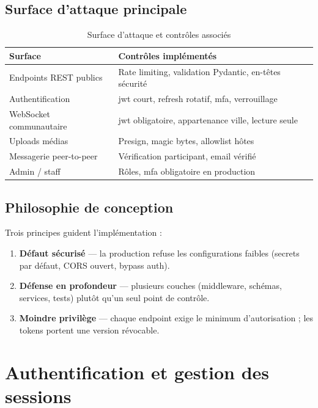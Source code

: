 \subsection{Surface d'attaque principale}

\begin{table}[H]
  \centering
  \caption{Surface d'attaque et contrôles associés}
  \label{tab:attack-surface}
  \begin{tabularx}{\textwidth}{@{}lX@{}}
    \toprule
    \textbf{Surface} & \textbf{Contrôles implémentés} \\
    \midrule
    Endpoints REST publics & Rate limiting, validation Pydantic, en-têtes sécurité \\
    Authentification & \gls{jwt} court, refresh rotatif, \gls{mfa}, verrouillage \\
    WebSocket communautaire & \gls{jwt} obligatoire, appartenance ville, lecture seule \\
    Uploads médias & Presign, magic bytes, allowlist hôtes \\
    Messagerie peer-to-peer & Vérification participant, email vérifié \\
    Admin / staff & Rôles, \gls{mfa} obligatoire en production \\
    \bottomrule
  \end{tabularx}
\end{table}

\subsection{Philosophie de conception}

Trois principes guident l'implémentation :
\begin{enumerate}
  \item \textbf{Défaut sécurisé} --- la production refuse les configurations faibles (secrets par défaut, CORS ouvert, bypass auth).
  \item \textbf{Défense en profondeur} --- plusieurs couches (middleware, schémas, services, tests) plutôt qu'un seul point de contrôle.
  \item \textbf{Moindre privilège} --- chaque endpoint exige le minimum d'autorisation ; les tokens portent une version révocable.
\end{enumerate}

\section{Authentification et gestion des sessions}

